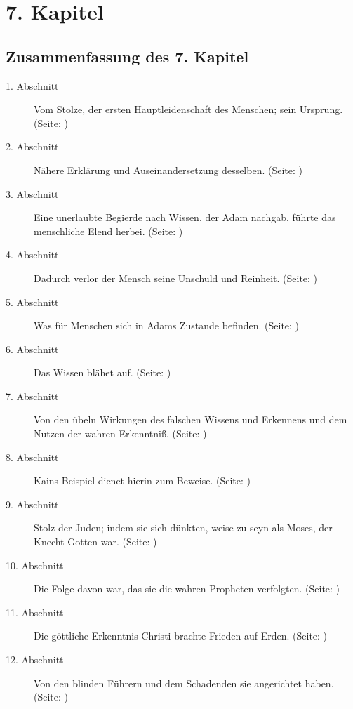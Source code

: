 

\chapter{7. Kapitel} \label{kap7}

\section{Zusammenfassung des 7. Kapitel}
\footnotesize
\begin{description}
\item[1. Abschnitt] Vom Stolze, der ersten Hauptleidenschaft des Menschen; sein
Ursprung. (Seite: \pageref{kap7_ab1})
\item[2. Abschnitt]  Nähere Erklärung und Auseinandersetzung desselben. (Seite: \pageref{kap7_ab2})
\item[3. Abschnitt] Eine unerlaubte Begierde nach Wissen, der Adam nachgab,
führte das menschliche Elend herbei. (Seite: \pageref{kap7_ab3})
\item[4. Abschnitt] Dadurch verlor der Mensch seine Unschuld und Reinheit. (Seite: \pageref{kap7_ab4})
\item[5. Abschnitt] Was für Menschen sich in Adams Zustande befinden. (Seite: \pageref{kap7_ab5})
\item[6. Abschnitt] Das Wissen blähet auf. (Seite: \pageref{kap7_ab6})
\item[7. Abschnitt] Von den übeln Wirkungen des falschen Wissens und Erkennens
und dem Nutzen der wahren Erkenntniß. (Seite: \pageref{kap7_ab7})
\item[8. Abschnitt] Kains Beispiel dienet hierin zum Beweise. (Seite: \pageref{kap7_ab8})
\item[9. Abschnitt] Stolz der Juden; indem sie sich dünkten, weise zu seyn als
Moses, der Knecht Gotten war. (Seite: \pageref{kap7_ab9})
\item[10. Abschnitt] Die Folge davon war, das sie die wahren Propheten
verfolgten. (Seite: \pageref{kap7_ab10})
\item[11. Abschnitt] Die göttliche Erkenntnis Christi brachte Frieden auf Erden. (Seite: \pageref{kap7_ab11})
\item[12. Abschnitt] Von den blinden Führern und dem Schadenden sie angerichtet
haben. (Seite: \pageref{kap7_ab12})

\end{description}
